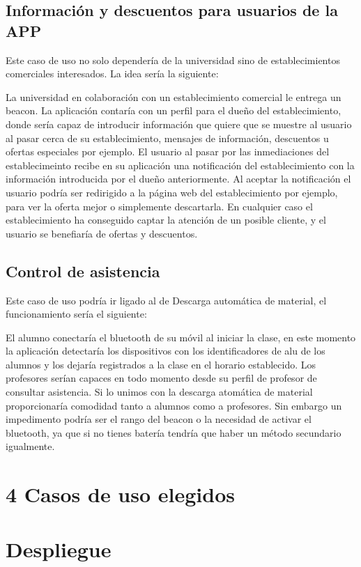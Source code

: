\subsection{Información y descuentos para usuarios de la APP}

Este caso de uso no solo dependería de la universidad sino de establecimientos comerciales interesados. La idea sería la siguiente: 

La universidad en colaboración con un establecimiento comercial le entrega un beacon. La aplicación contaría con un perfil para el dueño del establecimiento, donde sería capaz de introducir información que quiere que se muestre al usuario al pasar cerca de su establecimiento, mensajes de información, descuentos u ofertas especiales por ejemplo. El usuario al pasar por las inmediaciones del establecimeinto recibe en su aplicación una notificación del establecimiento con la información introducida por el dueño anteriormente. Al aceptar la notificación el usuario podría ser redirigido a la página web del establecimiento por ejemplo, para ver la oferta mejor o simplemente descartarla. En cualquier caso el establecimiento ha conseguido captar la atención de un posible cliente, y el usuario se benefiaría de ofertas y descuentos. 

\subsection{Control de asistencia}

Este caso de uso podría ir ligado al de Descarga automática de material, el funcionamiento sería el siguiente: 

El alumno conectaría el bluetooth de su móvil al iniciar la clase, en este momento la aplicación detectaría los dispositivos con los identificadores de alu de los alumnos y los dejaría registrados a la clase en el horario establecido. Los profesores serían capaces en todo momento desde su perfil de profesor de consultar asistencia. Si lo unimos con la descarga atomática de material proporcionaría comodidad tanto a alumnos como a profesores. Sin embargo un impedimento podría ser el rango del beacon o la necesidad de activar el bluetooth, ya que si  no tienes batería tendría que haber  un método secundario igualmente. 

\subsection{}

\section{4 Casos de uso elegidos}


\section{Despliegue}


